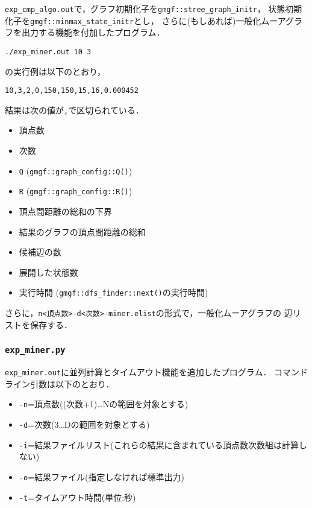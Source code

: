 \texttt{exp\_cmp\_algo.out}で，グラフ初期化子を\texttt{gmgf::stree\_graph\_initr}，
状態初期化子を\texttt{gmgf::minmax\_state\_initr}とし，
さらに(もしあれば)一般化ムーアグラフを出力する機能を付加したプログラム．

\begin{verbatim}
./exp_miner.out 10 3
\end{verbatim}

の実行例は以下のとおり，

\begin{verbatim}
10,3,2,0,150,150,15,16,0.000452
\end{verbatim}

結果は次の値が\texttt{,}で区切られている．

\begin{itemize}
\tightlist
\item
  頂点数
\item
  次数
\item
  \texttt{Q} (\texttt{gmgf::graph\_config::Q()})
\item
  \texttt{R} (\texttt{gmgf::graph\_config::R()})
\item
  頂点間距離の総和の下界
\item
  結果のグラフの頂点間距離の総和
\item
  候補辺の数
\item
  展開した状態数
\item
  実行時間 (\texttt{gmgf::dfs\_finder::next()}の実行時間)
\end{itemize}

さらに，\texttt{n\textless{}頂点数\textgreater{}-d\textless{}次数\textgreater{}-miner.elist}の形式で，一般化ムーアグラフの
辺リストを保存する．

\subsubsection*{\texorpdfstring{\texttt{exp\_miner.py}}{exp\_miner.py}}\label{expux5fminer.py}

\texttt{exp\_miner.out}に並列計算とタイムアウト機能を追加したプログラム．
コマンドライン引数は以下のとおり．

\begin{itemize}
\tightlist
\item
  \texttt{-n}=頂点数((次数+1)\ldots{}Nの範囲を対象とする)
\item
  \texttt{-d}=次数(3\ldots{}Dの範囲を対象とする)
\item
  \texttt{-i}=結果ファイルリスト(これらの結果に含まれている頂点数次数組は計算しない)
\item
  \texttt{-o}=結果ファイル(指定しなければ標準出力)
\item
  \texttt{-t}=タイムアウト時間(単位:秒)
\end{itemize}

